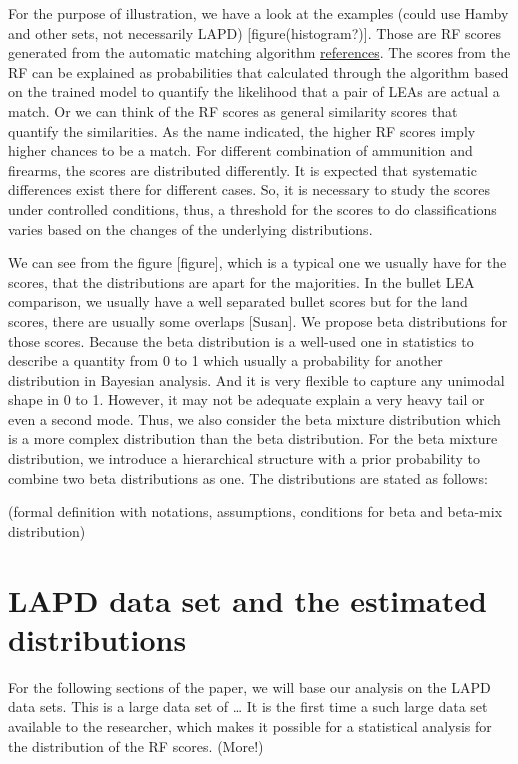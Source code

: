 \documentclass[]{elsarticle} %
\begin{document}
For the purpose of illustration, we have a look at the examples (could
use Hamby and other sets, not necessarily LAPD)
{[}figure(histogram?){]}. Those are RF scores generated from the
automatic matching algorithm \protect\hyperlink{references}{references}.
The scores from the RF can be explained as probabilities that calculated
through the algorithm based on the trained model to quantify the
likelihood that a pair of LEAs are actual a match. Or we can think of
the RF scores as general similarity scores that quantify the
similarities. As the name indicated, the higher RF scores imply higher
chances to be a match. For different combination of ammunition and
firearms, the scores are distributed differently. It is expected that
systematic differences exist there for different cases. So, it is
necessary to study the scores under controlled conditions, thus, a
threshold for the scores to do classifications varies based on the
changes of the underlying distributions.

We can see from the figure {[}figure{]}, which is a typical one we
usually have for the scores, that the distributions are apart for the
majorities. In the bullet LEA comparison, we usually have a well
separated bullet scores but for the land scores, there are usually some
overlaps {[}Susan{]}. We propose beta distributions for those scores.
Because the beta distribution is a well-used one in statistics to
describe a quantity from 0 to 1 which usually a probability for another
distribution in Bayesian analysis. And it is very flexible to capture
any unimodal shape in 0 to 1. However, it may not be adequate explain a
very heavy tail or even a second mode. Thus, we also consider the beta
mixture distribution which is a more complex distribution than the beta
distribution. For the beta mixture distribution, we introduce a
hierarchical structure with a prior probability to combine two beta
distributions as one. The distributions are stated as follows:

(formal definition with notations, assumptions, conditions for beta and
beta-mix distribution)

\hypertarget{lapd-data-set-and-the-estimated-distributions}{%
\section{LAPD data set and the estimated
distributions}\label{lapd-data-set-and-the-estimated-distributions}}

For the following sections of the paper, we will base our analysis on
the LAPD data sets. This is a large data set of \ldots{} It is the first
time a such large data set available to the researcher, which makes it
possible for a statistical analysis for the distribution of the RF
scores. (More!)
\end{document}
